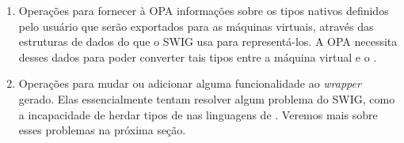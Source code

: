   \begin{enumerate}
    \item Operações para fornecer à OPA informações sobre os tipos nativos definidos pelo
      usuário que serão exportados para as máquinas virtuais, através das estruturas de dados
      do que o SWIG usa para representá-los. A OPA necessita desses dados para poder converter
      tais tipos entre a máquina virtual e o \CXX{}.
    \item Operações para mudar ou adicionar alguma funcionalidade ao \textit{wrapper}
      gerado. Elas essencialmente tentam resolver algum problema do SWIG, como
      a incapacidade de herdar tipos de \CXX{} nas linguagens de \script{}. Veremos mais
      sobre esses problemas na próxima seção.
  \end{enumerate}
  
